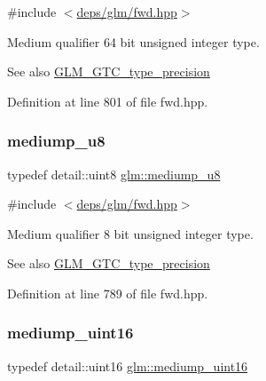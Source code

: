 {\ttfamily \#include $<$\hyperlink{fwd_8hpp}{deps/glm/fwd.\+hpp}$>$}

Medium qualifier 64 bit unsigned integer type. \begin{DoxySeeAlso}{See also}
\hyperlink{group__gtc__type__precision}{G\+L\+M\+\_\+\+G\+T\+C\+\_\+type\+\_\+precision} 
\end{DoxySeeAlso}


Definition at line 801 of file fwd.\+hpp.

\mbox{\label{group__gtc__type__precision_gac04b372784392e82bd557f300c4de097}} 
\subsubsection{\texorpdfstring{mediump\+\_\+u8}{mediump\_u8}}
{\footnotesize\ttfamily typedef detail\+::uint8 \hyperlink{group__gtc__type__precision_gac04b372784392e82bd557f300c4de097}{glm\+::mediump\+\_\+u8}}



{\ttfamily \#include $<$\hyperlink{fwd_8hpp}{deps/glm/fwd.\+hpp}$>$}

Medium qualifier 8 bit unsigned integer type. \begin{DoxySeeAlso}{See also}
\hyperlink{group__gtc__type__precision}{G\+L\+M\+\_\+\+G\+T\+C\+\_\+type\+\_\+precision} 
\end{DoxySeeAlso}


Definition at line 789 of file fwd.\+hpp.

\mbox{\label{group__gtc__type__precision_ga2cef3a0d7b0fce75c9885f64656d8933}} 
\subsubsection{\texorpdfstring{mediump\+\_\+uint16}{mediump\_uint16}}
{\footnotesize\ttfamily typedef detail\+::uint16 \hyperlink{group__gtc__type__precision_ga2cef3a0d7b0fce75c9885f64656d8933}{glm\+::mediump\+\_\+uint16}}



